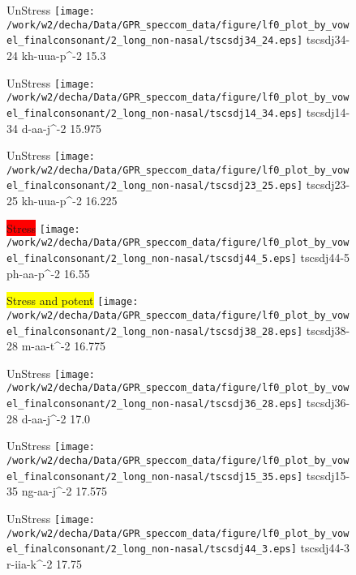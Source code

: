 \documentclass{article}
\begin{document}
\begin{figure}[t]
\begin{minipage}[b]{.24\textwidth}
UnStress
\centering
\texttt{[image: /work/w2/decha/Data/GPR\_speccom\_data/figure/lf0\_plot\_by\_vowel\_finalconsonant/2\_long\_non-nasal/tscsdj34\_24.eps]}
tscsdj34-24 kh-uua-p\textasciicircum-2 15.3
\end{minipage}
\begin{minipage}[b]{.24\textwidth}
UnStress
\centering
\texttt{[image: /work/w2/decha/Data/GPR\_speccom\_data/figure/lf0\_plot\_by\_vowel\_finalconsonant/2\_long\_non-nasal/tscsdj14\_34.eps]}
tscsdj14-34 d-aa-j\textasciicircum-2 15.975
\end{minipage}
\begin{minipage}[b]{.24\textwidth}
UnStress
\centering
\texttt{[image: /work/w2/decha/Data/GPR\_speccom\_data/figure/lf0\_plot\_by\_vowel\_finalconsonant/2\_long\_non-nasal/tscsdj23\_25.eps]}
tscsdj23-25 kh-uua-p\textasciicircum-2 16.225
\end{minipage}
\begin{minipage}[b]{.24\textwidth}
\colorbox{red}{Stress}
\centering
\texttt{[image: /work/w2/decha/Data/GPR\_speccom\_data/figure/lf0\_plot\_by\_vowel\_finalconsonant/2\_long\_non-nasal/tscsdj44\_5.eps]}
tscsdj44-5 ph-aa-p\textasciicircum-2 16.55
\end{minipage}
\end{figure}
\clearpage
\begin{figure}[t]
\begin{minipage}[b]{.24\textwidth}
\colorbox{yellow}{Stress and potent}
\centering
\texttt{[image: /work/w2/decha/Data/GPR\_speccom\_data/figure/lf0\_plot\_by\_vowel\_finalconsonant/2\_long\_non-nasal/tscsdj38\_28.eps]}
tscsdj38-28 m-aa-t\textasciicircum-2 16.775
\end{minipage}
\begin{minipage}[b]{.24\textwidth}
UnStress
\centering
\texttt{[image: /work/w2/decha/Data/GPR\_speccom\_data/figure/lf0\_plot\_by\_vowel\_finalconsonant/2\_long\_non-nasal/tscsdj36\_28.eps]}
tscsdj36-28 d-aa-j\textasciicircum-2 17.0
\end{minipage}
\begin{minipage}[b]{.24\textwidth}
UnStress
\centering
\texttt{[image: /work/w2/decha/Data/GPR\_speccom\_data/figure/lf0\_plot\_by\_vowel\_finalconsonant/2\_long\_non-nasal/tscsdj15\_35.eps]}
tscsdj15-35 ng-aa-j\textasciicircum-2 17.575
\end{minipage}
\begin{minipage}[b]{.24\textwidth}
UnStress
\centering
\texttt{[image: /work/w2/decha/Data/GPR\_speccom\_data/figure/lf0\_plot\_by\_vowel\_finalconsonant/2\_long\_non-nasal/tscsdj44\_3.eps]}
tscsdj44-3 r-iia-k\textasciicircum-2 17.75
\end{minipage}
\end{figure}
\end{document}
